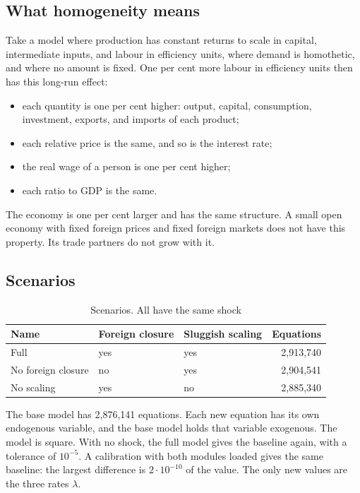 \documentclass[11pt,a4paper]{article}
\begin{document}
\subsection{What homogeneity means}

Take a model where production has constant returns to scale in capital, intermediate inputs, and labour in efficiency units, where demand is homothetic, and where no amount is fixed.
One per cent more labour in efficiency units then has this long-run effect:
\begin{itemize}
\item each quantity is one per cent higher: output, capital, consumption, investment, exports, and imports of each product;
\item each relative price is the same, and so is the interest rate;
\item the real wage of a person is one per cent higher;
\item each ratio to GDP is the same.
\end{itemize}
The economy is one per cent larger and has the same structure.
A small open economy with fixed foreign prices and fixed foreign markets does not have this property. Its trade partners do not grow with it.

\subsection{Scenarios}

\begin{table}[H]
\centering
\small
\caption{Scenarios. All have the same shock}
\label{tab:scenarios}
\begin{tabular}{@{}lllr@{}}
\toprule
Name & Foreign closure & Sluggish scaling & Equations \\
\midrule
Full & yes & yes & 2{,}913{,}740 \\
No foreign closure & no & yes & 2{,}904{,}541 \\
No scaling & yes & no & 2{,}885{,}340 \\
\bottomrule
\end{tabular}
\end{table}

The base model has 2{,}876{,}141 equations. Each new equation has its own endogenous variable, and the base model holds that variable exogenous. The model is square.
With no shock, the full model gives the baseline again, with a tolerance of $10^{-5}$.
A calibration with both modules loaded gives the same baseline: the largest difference is $2 \cdot 10^{-10}$ of the value. The only new values are the three rates $\lambda$.
\end{document}
